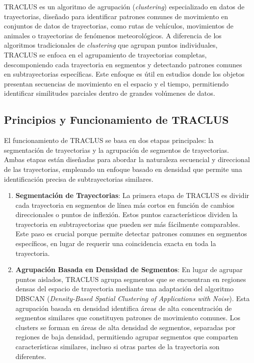 TRACLUS \cite{lee2007trajectory} es un algoritmo de agrupación (\textit{clustering}) especializado en datos de trayectorias, diseñado para identificar patrones comunes de movimiento en conjuntos de datos de trayectorias, como rutas de vehículos, movimientos de animales o trayectorias de fenómenos meteorológicos. A diferencia de los algoritmos tradicionales de \textit{clustering} que agrupan puntos individuales, TRACLUS se enfoca en el agrupamiento de trayectorias completas, descomponiendo cada trayectoria en segmentos y detectando patrones comunes en subtrayectorias específicas. Este enfoque es útil en estudios donde los objetos presentan secuencias de movimiento en el espacio y el tiempo, permitiendo identificar similitudes parciales dentro de grandes volúmenes de datos.

\subsection*{Principios y Funcionamiento de TRACLUS}

El funcionamiento de TRACLUS se basa en dos etapas principales: la segmentación de trayectorias y la agrupación de segmentos de trayectorias. Ambas etapas están diseñadas para abordar la naturaleza secuencial y direccional de las trayectorias, empleando un enfoque basado en densidad que permite una identificación precisa de subtrayectorias similares.

\begin{enumerate}
    \item \textbf{Segmentación de Trayectorias}: La primera etapa de TRACLUS es dividir cada trayectoria en segmentos de línea más cortos en función de cambios direccionales o puntos de inflexión. Estos puntos característicos dividen la trayectoria en subtrayectorias que pueden ser más fácilmente comparables. Este paso es crucial porque permite detectar patrones comunes en segmentos específicos, en lugar de requerir una coincidencia exacta en toda la trayectoria.

    \item \textbf{Agrupación Basada en Densidad de Segmentos}: En lugar de agrupar puntos aislados, TRACLUS agrupa segmentos que se encuentran en regiones densas del espacio de trayectoria mediante una adaptación del algoritmo DBSCAN (\textit{Density-Based Spatial Clustering of Applications with Noise}). Esta agrupación basada en densidad identifica áreas de alta concentración de segmentos similares que constituyen patrones de movimiento comunes. Los clusters se forman en áreas de alta densidad de segmentos, separadas por regiones de baja densidad, permitiendo agrupar segmentos que comparten características similares, incluso si otras partes de la trayectoria son diferentes.
\end{enumerate}

